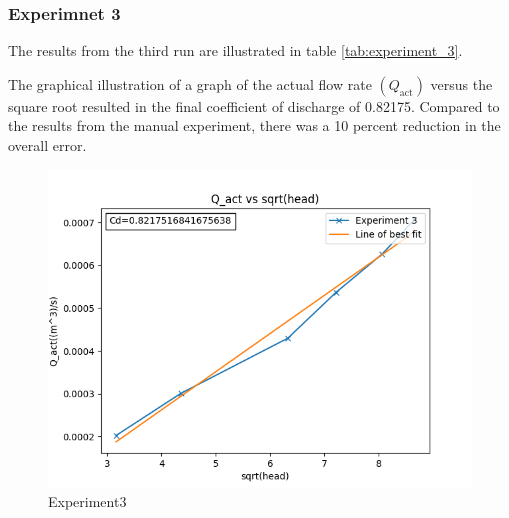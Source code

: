 \subsubsection{Experimnet 3}
\par
The results from the third run are illustrated in table \ref{tab:experiment_3}.
\begin{table}[H]
\centering
\caption{Experiment 3}
\label{tab:experiment_3}
\end{table}
\par
The graphical illustration of a graph of the actual flow rate $(Q_\text{act})$ versus the square root resulted in the final coefficient of discharge of 0.82175. Compared to the results from the manual experiment, there was a 10 percent reduction in the overall error. 
\begin{figure}[H]
            \centering
        \includegraphics[width=.85\textwidth]{Figures/Experiment3.png}
            \caption{Experiment3}
            \label{fig: Experiment3}
        \end{figure}
